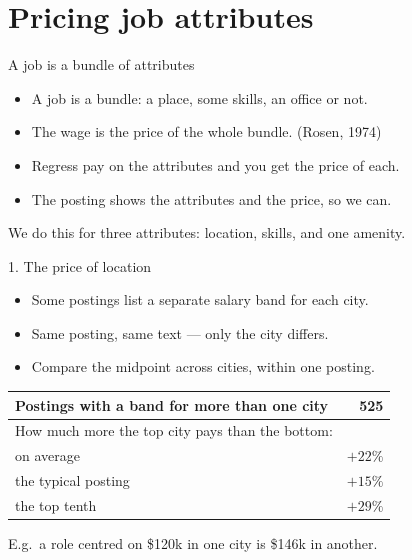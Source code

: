 \documentclass[11pt,aspectratio=169]{beamer}
\newenvironment{wideitemize}
  {\begin{itemize}\setlength{\itemsep}{10pt}}
  {\end{itemize}}
\begin{document}
\section{Pricing job attributes}
\begin{frame}{A job is a bundle of attributes}
\begin{wideitemize}
  \item A job is a bundle: a place, some skills, an office or not.
  \item The wage is the price of the whole bundle. (Rosen, 1974)
  \item Regress pay on the attributes and you get the price of each.
  \item The posting shows the attributes and the price, so we can.
\end{wideitemize}

\vspace{0.8em}
{\footnotesize We do this for three attributes: location, skills, and one amenity.}
\end{frame}

\begin{frame}{1. The price of location}
\begin{wideitemize}
  \item Some postings list a separate salary band for each city.
  \item Same posting, same text --- only the city differs.
  \item Compare the midpoint across cities, within one posting.
\end{wideitemize}

\vspace{0.4em}
\begin{table}
\centering\small
\begin{tabular}{lr}
\toprule
Postings with a band for more than one city & 525 \\
\midrule
How much more the top city pays than the bottom: & \\
\quad on average          & $+22\%$ \\
\quad the typical posting & $+15\%$ \\
\quad the top tenth       & $+29\%$ \\
\bottomrule
\end{tabular}
\end{table}

\vspace{0.3em}
{\footnotesize E.g.\ a role centred on \$120k in one city is \$146k in another.}
\end{frame}
\end{document}
